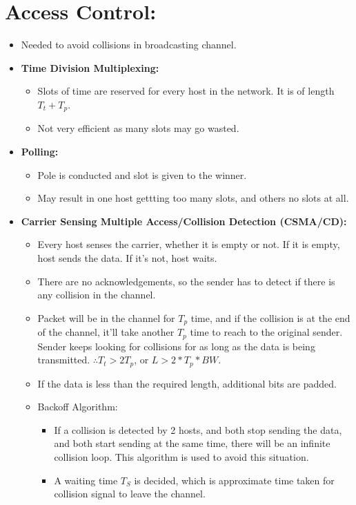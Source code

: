 \documentclass{article}
\begin{document}
\section{Access Control:}
\begin{itemize}
	\item Needed to avoid collisions in broadcasting channel.
	\item \textbf{Time Division Multiplexing:}\begin{itemize}
		\item Slots of time are reserved for every host in the network. It is of length $T_t+T_p$.
		\item Not very efficient as many slots may go wasted.
	\end{itemize}
	\item \textbf{Polling:}\begin{itemize}
		\item Pole is conducted and slot is given to the winner.
		\item May result in one host gettting too many slots, and others no slots at all.
	\end{itemize}
	\item \textbf{Carrier Sensing Multiple Access/Collision Detection (CSMA/CD):}\begin{itemize}
		\item Every host senses the carrier, whether it is empty or not. If it is empty, host sends the data. If it's not, host waits.
		\item There are no acknowledgements, so the sender has to detect if there is any collision in the channel.
		\item Packet will be in the channel for $T_p$ time, and if the collision is at the end of the channel, it'll take another $T_p$ time to reach to the original sender. Sender keeps looking for collisions for as long as the data is being transmitted. $\therefore T_t>2T_p$, or $L>2*T_p*BW$.
		\item If the data is less than the required length, additional bits are padded.
		\item Backoff Algorithm: \begin{itemize}
			\item If a collision is detected by 2 hosts, and both stop sending the data, and both start sending at the same time, there will be an infinite collision loop. This algorithm is used to avoid this situation.
			\item A waiting time $T_S$ is decided, which is approximate time taken for collision signal to leave the channel.

\end{itemize}
\end{itemize}
\end{itemize}
\end{document}
